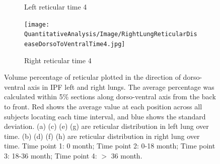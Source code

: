 \begin{figure}[H]
\begin{subfigure}{.41\linewidth}
  \caption{Left reticular time 4}
  \label{fig:DiseaseDorsoToVentralOverTime2-g} 
\end{subfigure} 
\begin{subfigure}{.41\linewidth}%
  \texttt{[image: QuantitativeAnalysis/Image/RightLungReticularDiseaseDorsoToVentralTime4.jpg]}
  \caption{Right reticular time 4}
  \label{fig:DiseaseDorsoToVentralOverTime2-h}
\end{subfigure}
\caption{Volume percentage of reticular plotted in the direction of dorso-ventral axis in IPF left and right lungs. The average percentage was calculated within 5\% sections along dorso-ventral axis from the back to front. Red shows the average value at each position across all subjects locating each time interval, and blue shows the standard deviation. (a) (c) (e) (g) are reticular distribution in left lung over time. (b) (d) (f) (h) are reticular distribution in right lung over time. Time point 1: 0 month; Time point 2: 0-18 month; Time point 3: 18-36 month; Time point 4: $>$ 36 month.}
\label{fig:DiseaseDorsoToVentralOverTime2}
\end{figure}

